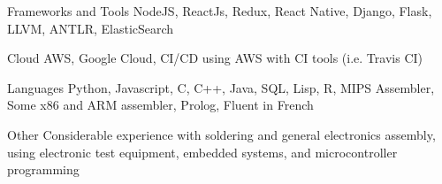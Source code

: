 
\begin{cvskills}
  \vspace{.5mm}
  \cvskill
    {Frameworks and Tools}
    {NodeJS, ReactJs, Redux, React Native, Django, Flask, LLVM, ANTLR, ElasticSearch}

  \vspace{.5mm}
  \cvskill
    {Cloud}
    {AWS, Google Cloud, CI/CD using AWS with CI tools (i.e. Travis CI)}

  \vspace{.5mm}
  \cvskill
    {Languages} %
    {Python, Javascript, C, C++, Java, SQL, Lisp, R, MIPS Assembler, Some x86 and ARM assembler, Prolog, Fluent in French}

  \vspace{.5mm}
  \cvskill
    {Other}
    {Considerable experience with soldering and general electronics assembly, using electronic test equipment, \newline
    embedded systems, and microcontroller programming}
\end{cvskills}
